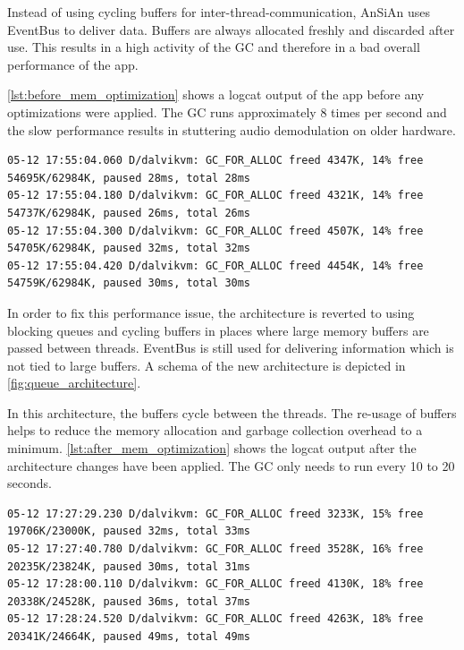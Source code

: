 Instead of using cycling buffers for inter-thread-communication, AnSiAn uses
EventBus to deliver data. Buffers are always allocated freshly
and discarded after use. This results in a high activity of the
\ac{GC} and therefore in a bad overall performance of the app.

\autoref{lst:before_mem_optimization} shows a logcat output of the
app before any optimizations were applied. The \ac{GC} runs approximately 8 times per second
and the slow performance results in stuttering audio demodulation on
older hardware.

\begin{lstlisting}[label=lst:before_mem_optimization, caption=Logcat output
before memory optimizations, language=none]
05-12 17:55:04.060 D/dalvikvm: GC_FOR_ALLOC freed 4347K, 14% free 54695K/62984K, paused 28ms, total 28ms
05-12 17:55:04.180 D/dalvikvm: GC_FOR_ALLOC freed 4321K, 14% free 54737K/62984K, paused 26ms, total 26ms
05-12 17:55:04.300 D/dalvikvm: GC_FOR_ALLOC freed 4507K, 14% free 54705K/62984K, paused 32ms, total 32ms
05-12 17:55:04.420 D/dalvikvm: GC_FOR_ALLOC freed 4454K, 14% free 54759K/62984K, paused 30ms, total 30ms
\end{lstlisting}

In order to fix this performance issue, the architecture is reverted
to using blocking queues and cycling buffers in places where large memory buffers are passed
between threads. EventBus is still used for delivering information
which is not tied to large buffers. A schema of the new architecture
is depicted in \autoref{fig:queue_architecture}. 

In this architecture, the buffers cycle between the threads. The re-usage
of buffers helps to reduce the memory allocation and garbage collection
overhead to a minimum. \autoref{lst:after_mem_optimization} shows the
logcat output after the architecture changes have been applied. The \ac{GC}
only needs to run every 10 to 20 seconds.


\begin{lstlisting}[label=lst:after_mem_optimization, caption=Logcat output
after memory optimizations, language=none]
05-12 17:27:29.230 D/dalvikvm: GC_FOR_ALLOC freed 3233K, 15% free 19706K/23000K, paused 32ms, total 33ms
05-12 17:27:40.780 D/dalvikvm: GC_FOR_ALLOC freed 3528K, 16% free 20235K/23824K, paused 30ms, total 31ms
05-12 17:28:00.110 D/dalvikvm: GC_FOR_ALLOC freed 4130K, 18% free 20338K/24528K, paused 36ms, total 37ms
05-12 17:28:24.520 D/dalvikvm: GC_FOR_ALLOC freed 4263K, 18% free 20341K/24664K, paused 49ms, total 49ms
\end{lstlisting}


%

